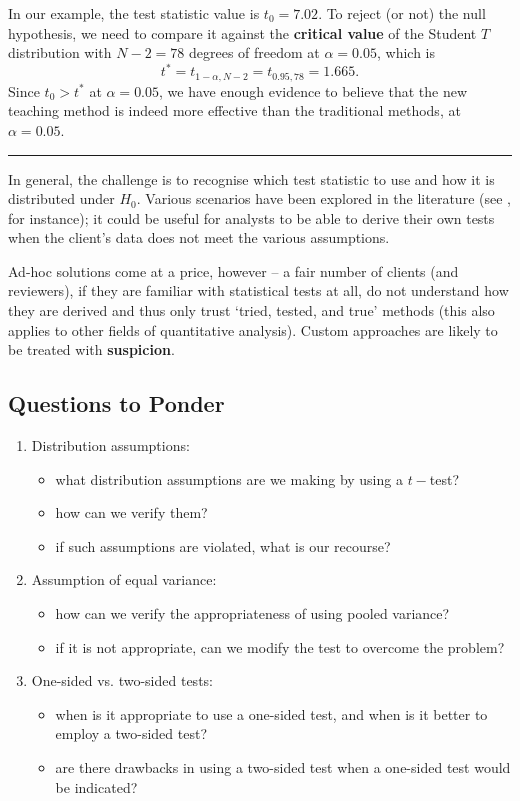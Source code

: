 \newpage\noindent In our example, the test statistic value is $t_{0} = 7.02$. To reject (or not) the null hypothesis, we need to compare it against the \textbf{critical value} of the Student $T$ distribution with $N-2=78$ degrees of freedom at $\alpha=0.05$, which is $$t^*= t_{1-\alpha, N-2}=t_{0.95, 78}=1.665.$$ Since $t_{0} > t^*$ at $\alpha=0.05$, we have enough evidence to believe that the new teaching method is indeed more effective than the traditional methods, at $\alpha=0.05$.
\begin{center}
    \rule{0.25\textwidth}{.4pt}
\end{center} In general, the challenge is to recognise which test statistic to use and how it is distributed under $H_0$. Various scenarios have been explored in the literature (see \cite{SA_KNNL}, for instance); it could be useful  for analysts to be able to derive their own tests when the client's data does not meet the various assumptions. \par Ad-hoc solutions come at a price, however -- a fair number of clients (and reviewers), if they are familiar with statistical tests at all, do not understand how they are derived and thus only trust `tried, tested, and true' methods (this also applies to other fields of quantitative analysis). Custom approaches are likely to be treated with \textbf{suspicion}.   

\subsection{Questions to Ponder}
\begin{enumerate}
    \item Distribution assumptions:
    \begin{itemize}[noitemsep]
        \item what distribution assumptions are we making by using a $t-$test?
        \item how can we verify them?
        \item if such assumptions are violated, what is our recourse?
    \end{itemize}
    \item Assumption of equal variance:
    \begin{itemize}[noitemsep]
        \item how can we verify the appropriateness of using pooled variance?
        \item if it is not appropriate, can we modify the test to overcome the problem?
    \end{itemize}
    \item One-sided vs. two-sided tests:
    \begin{itemize}[noitemsep]
        \item when is it appropriate to use a one-sided test, and when is it better to employ a two-sided test?
        \item are there drawbacks in using a two-sided test when a one-sided test would be indicated?
    \end{itemize}
\end{enumerate}

